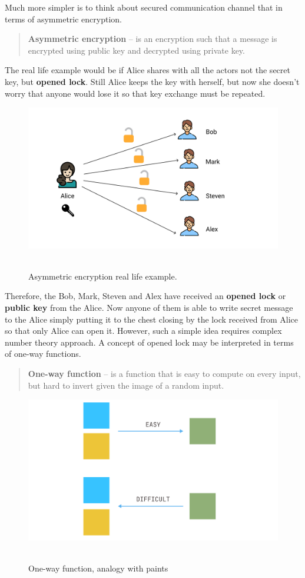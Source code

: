 Much more simpler is to think about secured communication channel that in terms of asymmetric encryption.
\begin{quote}
    \textbf{Asymmetric encryption} -- is an encryption such that a message is encrypted using public key and
    decrypted using private key.
\end{quote}
The real life example would be if Alice shares with all the actors not the secret key, but \textbf{opened lock}.
Still Alice keeps the key with herself, but now she doesn't worry that anyone would lose it so that key exchange must be repeated.
\begin{figure}[H]
    \centering
    \includegraphics[width=1.15\textwidth]{./img/Asymmetric_encryption}
    ~\caption{Asymmetric encryption real life example.}\label{fig:figure2}
\end{figure}
Therefore, the Bob, Mark, Steven and Alex have received an \textbf{opened lock} or \textbf{public key} from the Alice.
Now anyone of them is able to write secret message to the Alice simply putting it to the chest closing by the lock
received from Alice so that only Alice can open it.
However, such a simple idea requires complex number theory approach.
A concept of opened lock may be interpreted in terms of one-way functions.
\begin{quote}
    \textbf{One-way function} -- is a function that is easy to compute on every input, but hard to invert given the image of
    a random input.
\end{quote}

\begin{figure}[H]
    \centering
    \includegraphics[width=1\textwidth]{./img/One_Way_Functions}
    ~\caption{One-way function, analogy with paints}\label{fig:figure3}
\end{figure}
